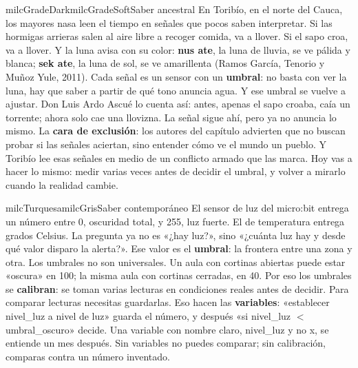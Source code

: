 \documentclass[11pt,letterpaper]{article}
\begin{document}
\begin{softbox}{milcGradeDark}{milcGradeSoft}{Saber ancestral}
En Toribío, en el norte del Cauca, los mayores nasa leen el tiempo en señales que pocos saben interpretar. Si las hormigas arrieras salen al aire libre a recoger comida, va a llover. Si el sapo croa, va a llover. Y la luna avisa con su color: \textbf{nus ate}, la luna de lluvia, se ve pálida y blanca; \textbf{sek ate}, la luna de sol, se ve amarillenta (Ramos García, Tenorio y Muñoz Yule, 2011). Cada señal es un sensor con un \textbf{umbral}: no basta con ver la luna, hay que saber a partir de qué tono anuncia agua. Y ese umbral se vuelve a ajustar. Don Luis Ardo Ascué lo cuenta así: antes, apenas el sapo croaba, caía un torrente; ahora solo cae una llovizna. La señal sigue ahí, pero ya no anuncia lo mismo. La \textbf{cara de exclusión}: los autores del capítulo advierten que no buscan probar si las señales aciertan, sino entender cómo ve el mundo un pueblo. Y Toribío lee esas señales en medio de un conflicto armado que las marca. Hoy vas a hacer lo mismo: medir varias veces antes de decidir el umbral, y volver a mirarlo cuando la realidad cambie.\par{}
\end{softbox}

\begin{softbox}{milcTurquesa}{milcGris}{Saber contemporáneo}
El sensor de luz del micro:bit entrega un número entre 0, oscuridad total, y 255, luz fuerte. El de temperatura entrega grados Celsius. La pregunta ya no es «¿hay luz?», sino «¿cuánta luz hay y desde qué valor disparo la alerta?». Ese valor es el \textbf{umbral}: la frontera entre una zona y otra. Los umbrales no son universales. Un aula con cortinas abiertas puede estar «oscura» en 100; la misma aula con cortinas cerradas, en 40. Por eso los umbrales se \textbf{calibran}: se toman varias lecturas en condiciones reales antes de decidir. Para comparar lecturas necesitas guardarlas. Eso hacen las \textbf{variables}: «establecer nivel\_luz a nivel de luz» guarda el número, y después «si nivel\_luz $<$ umbral\_oscuro» decide. Una variable con nombre claro, nivel\_luz y no x, se entiende un mes después. Sin variables no puedes comparar; sin calibración, comparas contra un número inventado.
\end{softbox}
\end{document}
